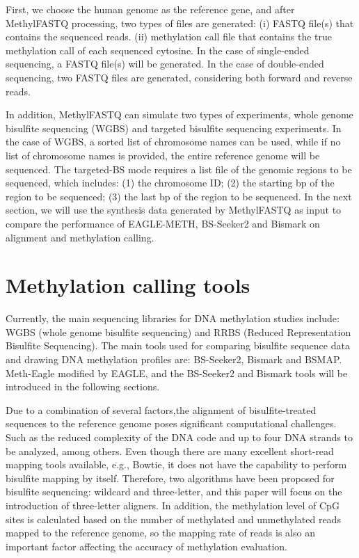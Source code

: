 \documentclass{PHlab-thesis}
\begin{document}
First, we choose the human genome as the reference gene, and after MethylFASTQ processing, two types of files are generated:
(i) FASTQ file(s) that contains the sequenced reads.
(ii) methylation call file that contains the true methylation call of each sequenced cytosine.
In the case of single-ended sequencing, a FASTQ file(s) will be generated. In the case of double-ended sequencing, two FASTQ files are generated, considering both forward and reverse reads.

In addition, MethylFASTQ can simulate two types of experiments, whole genome bisulfite sequencing (WGBS) and targeted bisulfite sequencing experiments. In the case of WGBS, a sorted list of chromosome names can be used, while if no list of chromosome names is provided, the entire reference genome will be sequenced. The targeted-BS mode requires a list file of the genomic regions to be sequenced, which includes:
(1) the chromosome ID;
(2) the starting bp of the region to be sequenced; 
(3) the last bp of the region to be sequenced. 
In the next section, we will use the synthesis data generated by MethylFASTQ as input to compare the performance of EAGLE-METH, BS-Seeker2 and Bismark on alignment and methylation calling.

\section{Methylation calling tools}
Currently, the main sequencing libraries for DNA methylation studies include: WGBS (whole genome bisulfite sequencing) and RRBS (Reduced Representation Bisulfite Sequencing). The main tools used for comparing bisulfite sequence data and drawing DNA methylation profiles are: BS-Seeker2, Bismark and BSMAP.  Meth-Eagle modified by EAGLE, and the BS-Seeker2 and Bismark tools will be introduced in the following sections. 

Due to a combination of several factors,the alignment of bisulfite-treated sequences to the reference genome poses significant computational challenges. Such as the reduced complexity of the DNA code and up to four DNA strands to be analyzed, among others. Even though there are many excellent short-read mapping tools available, e.g., Bowtie, it does not have the capability to perform bisulfite mapping by itself. Therefore, two algorithms have been proposed for bisulfite sequencing: wildcard and three-letter, and this paper will focus on the introduction of three-letter aligners\cite{krueger2011bismark}. In addition, the methylation level of CpG sites is calculated based on the number of methylated and unmethylated reads mapped to the reference genome, so the mapping rate of reads is also an important factor affecting the accuracy of methylation evaluation.
\end{document}
